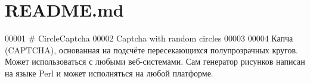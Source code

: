 \hypertarget{_r_e_a_d_m_e_8md_source}{}\section{R\+E\+A\+D\+M\+E.\+md}

\begin{DoxyCode}
00001 # CircleCaptcha
00002 Captcha with random circles
00003 
00004 Капча (CAPTCHA), основанная на подсчёте пересекающихся полупрозрачных кругов. Может использоваться с
       любыми веб-системами. Сам генератор рисунков написан на языке Perl и может исполняться на любой платформе.
\end{DoxyCode}
